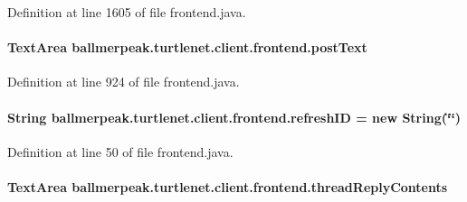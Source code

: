 Definition at line 1605 of file frontend.\-java.

\hypertarget{classballmerpeak_1_1turtlenet_1_1client_1_1frontend_af105d0e6450c2caedeaee033e8f5d444}{
\paragraph[{post\-Text}]{\setlength{\rightskip}{0pt plus 5cm}Text\-Area ballmerpeak.\-turtlenet.\-client.\-frontend.\-post\-Text\hspace{0.3cm}{\ttfamily [private]}}}\label{classballmerpeak_1_1turtlenet_1_1client_1_1frontend_af105d0e6450c2caedeaee033e8f5d444}


Definition at line 924 of file frontend.\-java.

\hypertarget{classballmerpeak_1_1turtlenet_1_1client_1_1frontend_a280a54ef9864d0adbd9a44e32b7a4775}{
\paragraph[{refresh\-I\-D}]{\setlength{\rightskip}{0pt plus 5cm}String ballmerpeak.\-turtlenet.\-client.\-frontend.\-refresh\-I\-D = new String(\char`\"{}\char`\"{})\hspace{0.3cm}{\ttfamily [private]}}}\label{classballmerpeak_1_1turtlenet_1_1client_1_1frontend_a280a54ef9864d0adbd9a44e32b7a4775}


Definition at line 50 of file frontend.\-java.

\hypertarget{classballmerpeak_1_1turtlenet_1_1client_1_1frontend_a0135fa512db0b8a94e65353bad182e11}{
\paragraph[{thread\-Reply\-Contents}]{\setlength{\rightskip}{0pt plus 5cm}Text\-Area ballmerpeak.\-turtlenet.\-client.\-frontend.\-thread\-Reply\-Contents\hspace{0.3cm}{\ttfamily [private]}}}\label{classballmerpeak_1_1turtlenet_1_1client_1_1frontend_a0135fa512db0b8a94e65353bad182e11}


